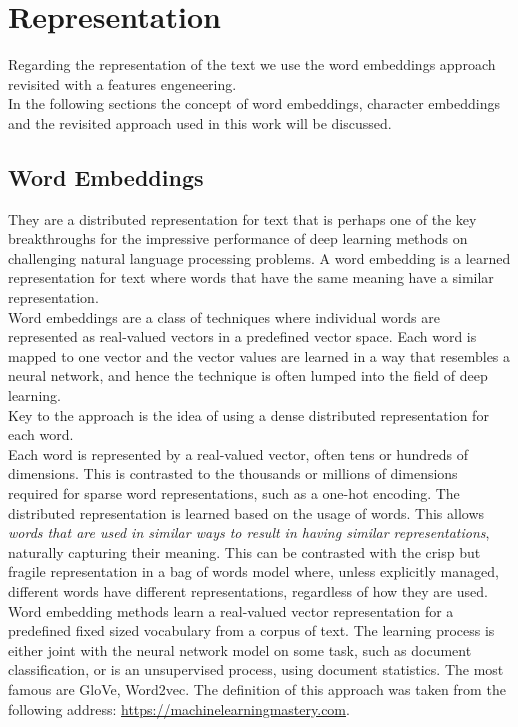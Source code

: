 \documentclass[twocolumn,10pt]{wmrDoc}
\begin{document}
  
\section{Representation}
Regarding the representation of the text we use the word embeddings approach revisited with a features engeneering.\\
In the following sections the concept of word embeddings, character embeddings and the revisited approach used in this work will be discussed.



\subsection{Word Embeddings}

They are a distributed representation for text that is perhaps one of the key breakthroughs for the impressive performance of deep learning methods on challenging natural language processing problems.
A word embedding is a learned representation for text where words that have the same meaning have a similar representation.\\
Word embeddings are a class of techniques where individual words are represented as real-valued vectors in a predefined vector space. Each word is mapped to one vector and the vector values are learned in a way that resembles a neural network, and hence the technique is often lumped into the field of deep learning.\\
Key to the approach is the idea of using a dense distributed representation for each word.\\
Each word is represented by a real-valued vector, often tens or hundreds of dimensions. This is contrasted to the thousands or millions of dimensions required for sparse word representations, such as a one-hot encoding.
The distributed representation is learned based on the usage of words. This allows \textit{words that are used in similar ways to result in having similar representations}, naturally capturing their meaning. This can be contrasted with the crisp but fragile representation in a bag of words model where, unless explicitly managed, different words have different representations, regardless of how they are used.
Word embedding methods learn a real-valued vector representation for a predefined fixed sized vocabulary from a corpus of text.
The learning process is either joint with the neural network model on some task, such as document classification, or is an unsupervised process, using document statistics. The most famous are GloVe, Word2vec.
The definition of this approach was taken from the following address: \url{https://machinelearningmastery.com}.
\end{document}
